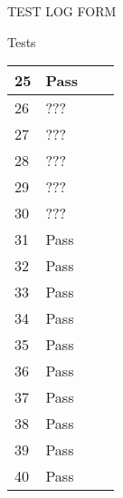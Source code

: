 \documentclass{article}
\begin{document}
\begin{section}{TEST LOG FORM}
\begin{subsection}{Tests}
\begin{tabularx}{\linewidth}{| p{1.5cm} | p{2cm} | p{9cm} | X |}
25
&
Pass
&

&

\\
\hline

26
&
???
&

&

\\
\hline

27
&
???
&

&

\\
\hline

28
&
???
&

&

\\
\hline

29
&
???
&

&

\\
\hline

30
&
???
&

&

\\
\hline

31
&
Pass
&

&

\\
\hline

32
&
Pass
&

&

\\
\hline

33
&
Pass
&

&

\\
\hline

34
&
Pass
&

&

\\
\hline

35
&
Pass
&

&

\\
\hline

36
&
Pass
&

&

\\
\hline

37
&
Pass
&

&

\\
\hline

38
&
Pass
&

&

\\
\hline

39
&
Pass
&

&

\\
\hline

40
&
Pass
&

&

\\
\hline

			\end{tabularx}
		\end{subsection}
	\end{section}
	
\end{document}
